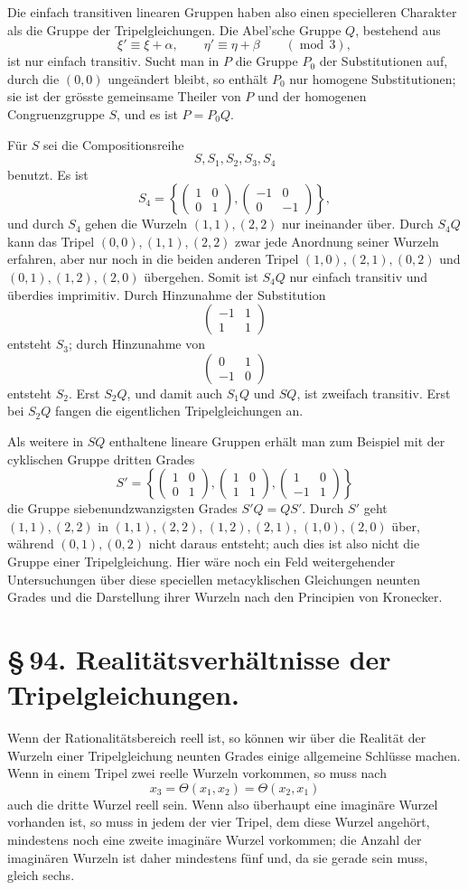 \documentclass[11pt]{article}
\providecommand{\mat}[4]{\begin{pmatrix}#1&#2\\#3&#4\end{pmatrix}}
\providecommand{\mat}[4]{\begin{pmatrix}#1&#2\\#3&#4\end{pmatrix}}
\providecommand{\mat}[1]{\begin{pmatrix}#1\end{pmatrix}}
\begin{document}
Die einfach transitiven linearen Gruppen haben also einen specielleren Charakter als die Gruppe der Tripelgleichungen. Die Abel'sche Gruppe \(Q\), bestehend aus
\begin{equation}
 \xi'\equiv \xi+\alpha,
 \qquad
 \eta'\equiv \eta+\beta
 \qquad(\operatorname{mod}\,3),
 \tag{9}
\end{equation}
ist nur einfach transitiv. Sucht man in \(P\) die Gruppe \(P_0\) der Substitutionen auf, durch die \((0,0)\) ungeändert bleibt, so enthält \(P_0\) nur homogene Substitutionen; sie ist der grösste gemeinsame Theiler von \(P\) und der homogenen Congruenzgruppe \(S\), und es ist \(P=P_0Q\).

Für \(S\) sei die Compositionsreihe
\[
 S,
 S_1,
 S_2,
 S_3,
 S_4
\]
benutzt. Es ist
\[
 S_4=\left\{
 \mat{1}{0}{0}{1},
 \mat{-1}{0}{0}{-1}
 \right\},
\]
und durch \(S_4\) gehen die Wurzeln \((1,1),(2,2)\) nur ineinander über. Durch \(S_4Q\) kann das Tripel \((0,0),(1,1),(2,2)\) zwar jede Anordnung seiner Wurzeln erfahren, aber nur noch in die beiden anderen Tripel \((1,0),(2,1),(0,2)\) und \((0,1),(1,2),(2,0)\) übergehen. Somit ist \(S_4Q\) nur einfach transitiv und überdies imprimitiv. Durch Hinzunahme der Substitution
\[
 \mat{-1}{1}{1}{1}
\]
entsteht \(S_3\); durch Hinzunahme von
\[
 \mat{0}{1}{-1}{0}
\]
entsteht \(S_2\). Erst \(S_2Q\), und damit auch \(S_1Q\) und \(SQ\), ist zweifach transitiv. Erst bei \(S_2Q\) fangen die eigentlichen Tripelgleichungen an.

Als weitere in \(SQ\) enthaltene lineare Gruppen erhält man zum Beispiel mit der cyklischen Gruppe dritten Grades
\[
 S'=\left\{
 \mat{1}{0}{0}{1},
 \mat{1}{0}{1}{1},
 \mat{1}{0}{-1}{1}
 \right\}
\]
die Gruppe siebenundzwanzigsten Grades \(S'Q=QS'\). Durch \(S'\) geht \((1,1),(2,2)\) in \((1,1),(2,2)\), \((1,2),(2,1)\), \((1,0),(2,0)\) über, während \((0,1),(0,2)\) nicht daraus entsteht; auch dies ist also nicht die Gruppe einer Tripelgleichung. Hier wäre noch ein Feld weitergehender Untersuchungen über diese speciellen metacyklischen Gleichungen neunten Grades und die Darstellung ihrer Wurzeln nach den Principien von Kronecker.

\section*{\S\,94. Realitätsverhältnisse der Tripelgleichungen.}

Wenn der Rationalitätsbereich reell ist, so können wir über die Realität der Wurzeln einer Tripelgleichung neunten Grades einige allgemeine Schlüsse machen. Wenn in einem Tripel zwei reelle Wurzeln vorkommen, so muss nach
\[
 x_3=\Theta(x_1,x_2)=\Theta(x_2,x_1)
\]
auch die dritte Wurzel reell sein. Wenn also überhaupt eine imaginäre Wurzel vorhanden ist, so muss in jedem der vier Tripel, dem diese Wurzel angehört, mindestens noch eine zweite imaginäre Wurzel vorkommen; die Anzahl der imaginären Wurzeln ist daher mindestens fünf und, da sie gerade sein muss, gleich sechs.
\end{document}

